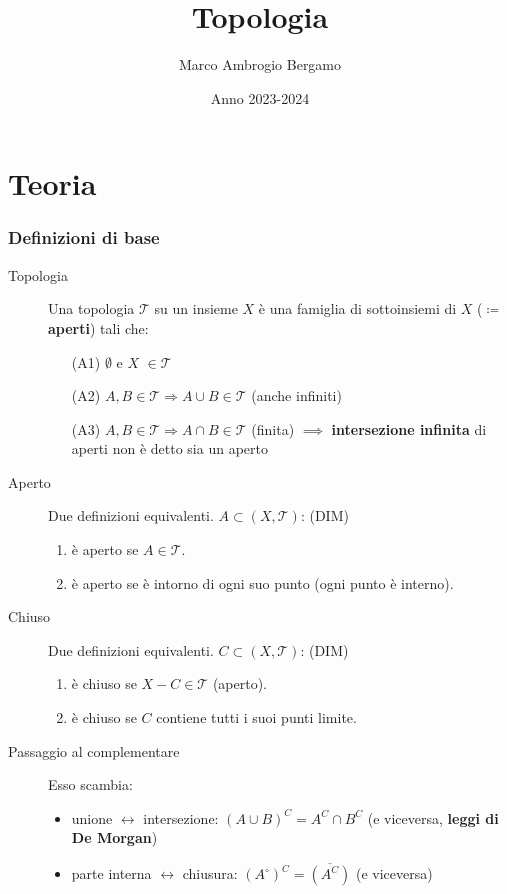 \documentclass[a4paper,10pt]{article}
\title{Topologia}
\author{Marco Ambrogio Bergamo}
\date{Anno 2023-2024}
\theoremstyle{remark}
\theoremstyle{definition}
\begin{document}
\maketitle


\part*{Teoria}

\section*{Definizioni di base}
\begin{description}
    
    \item[Topologia] Una topologia $\mathcal{T}$ su un insieme $X$ è una famiglia di sottoinsiemi di $X$ ($\coloneqq$ \textbf{aperti}) tali che:
    \begin{itemize}
        \item[(A1)] $\emptyset$ e $X$ $\in \mathcal{T}$
        \item[(A2)] $A, B \in \mathcal{T} \Rightarrow A \cup B \in \mathcal{T} $ (anche infiniti)
        \item[(A3)] $A, B \in \mathcal{T} \Rightarrow A \cap B \in \mathcal{T} $ (finita) $\implies$ \textbf{intersezione infinita} di aperti non è detto sia un aperto
    \end{itemize}

    \item[Aperto] Due definizioni equivalenti. $A \subset (X, \mathcal{T})$: (DIM)
    \begin{enumerate}
        \item è aperto se $A \in \mathcal{T}$.
        \item è aperto se è intorno di ogni suo punto (ogni punto è interno).
    \end{enumerate} 

    \item[Chiuso] Due definizioni equivalenti. $C \subset (X, \mathcal{T})$: (DIM)
    \begin{enumerate}
        \item è chiuso se $X - C \in \mathcal{T}$ (aperto).
        \item è chiuso se $C$ contiene tutti i suoi punti limite.
    \end{enumerate} 
    
       

    \item[Passaggio al complementare] Esso scambia:
     \begin{itemize}
         \item unione $\longleftrightarrow$ intersezione: $(A \cup B)^C = A^C \cap B^C$ (e viceversa, \textbf{leggi di De Morgan})
         \item parte interna $\longleftrightarrow$ chiusura: $(A^\circ)^C = \overline{(A^C)}$ (e viceversa)
     \end{itemize}


\end{description}
\end{document}
